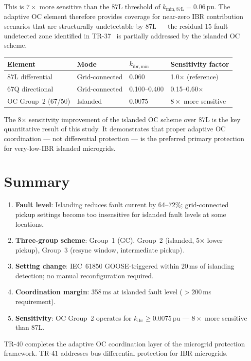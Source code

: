 \documentclass[11pt,a4paper]{article}
\begin{document}
This is $7\times$ more sensitive than the 87L threshold of $k_\mathrm{min,87L}=0.06$\,pu.
The adaptive OC element therefore provides coverage for near-zero IBR
contribution scenarios that are structurally undetectable by 87L --- the
residual 15-fault undetected zone identified in TR-37~\cite{SAMBP_TR35} is
partially addressed by the islanded OC scheme.

\begin{center}
\begin{tabular}{@{}llll@{}}
\toprule
Element & Mode & $k_\mathrm{ibr,min}$ & Sensitivity factor \\
\midrule
87L differential & Grid-connected & 0.060 & 1.0$\times$ (reference) \\
67Q directional & Grid-connected & 0.100--0.400 & 0.15--0.60$\times$ \\
OC Group~2 (67/50) & Islanded & 0.0075 & $8\times$ more sensitive \\
\bottomrule
\end{tabular}
\end{center}

\medskip\noindent
The 8$\times$ sensitivity improvement of the islanded OC scheme over 87L
is the key quantitative result of this study.  It demonstrates that proper
adaptive OC coordination --- not differential protection --- is the preferred
primary protection for very-low-IBR islanded microgrids.

\section{Summary}
\label{sec:summary}

\begin{enumerate}
  \item \textbf{Fault level}: Islanding reduces fault current by 64--72\%;
    grid-connected pickup settings become too insensitive for islanded fault
    levels at some locations.

  \item \textbf{Three-group scheme}: Group~1 (GC), Group~2 (islanded, 5$\times$
    lower pickup), Group~3 (resync window, intermediate pickup).

  \item \textbf{Setting change}: IEC~61850 GOOSE-triggered within 20\,ms of
    islanding detection; no manual reconfiguration required.

  \item \textbf{Coordination margin}: 358\,ms at islanded fault level
    ($>200$\,ms requirement).

  \item \textbf{Sensitivity}: OC Group~2 operates for $k_\mathrm{ibr}\geq0.0075$\,pu
    --- $8\times$ more sensitive than 87L.
\end{enumerate}

\noindent
TR-40 completes the adaptive OC coordination layer of the microgrid protection
framework.  TR-41 addresses bus differential protection for IBR microgrids.



\end{document}
